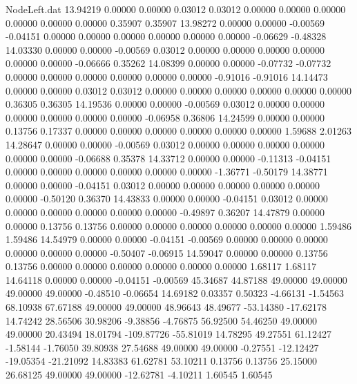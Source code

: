 \begin{filecontents}{NodeLeft.dat}
  13.94219    0.00000    0.00000     0.03012    0.03012    0.00000    0.00000    0.00000    0.00000    0.00000    0.00000    0.35907    0.35907
  13.98272    0.00000    0.00000    -0.00569   -0.04151    0.00000    0.00000    0.00000    0.00000    0.00000    0.00000   -0.06629   -0.48328
  14.03330    0.00000    0.00000    -0.00569    0.03012    0.00000    0.00000    0.00000    0.00000    0.00000    0.00000   -0.06666    0.35262
  14.08399    0.00000    0.00000    -0.07732   -0.07732    0.00000    0.00000    0.00000    0.00000    0.00000    0.00000   -0.91016   -0.91016
  14.14473    0.00000    0.00000     0.03012    0.03012    0.00000    0.00000    0.00000    0.00000    0.00000    0.00000    0.36305    0.36305
  14.19536    0.00000    0.00000    -0.00569    0.03012    0.00000    0.00000    0.00000    0.00000    0.00000    0.00000   -0.06958    0.36806
  14.24599    0.00000    0.00000     0.13756    0.17337    0.00000    0.00000    0.00000    0.00000    0.00000    0.00000    1.59688    2.01263
  14.28647    0.00000    0.00000    -0.00569    0.03012    0.00000    0.00000    0.00000    0.00000    0.00000    0.00000   -0.06688    0.35378
  14.33712    0.00000    0.00000    -0.11313   -0.04151    0.00000    0.00000    0.00000    0.00000    0.00000    0.00000   -1.36771   -0.50179
  14.38771    0.00000    0.00000    -0.04151    0.03012    0.00000    0.00000    0.00000    0.00000    0.00000    0.00000   -0.50120    0.36370
  14.43833    0.00000    0.00000    -0.04151    0.03012    0.00000    0.00000    0.00000    0.00000    0.00000    0.00000   -0.49897    0.36207
  14.47879    0.00000    0.00000     0.13756    0.13756    0.00000    0.00000    0.00000    0.00000    0.00000    0.00000    1.59486    1.59486
  14.54979    0.00000    0.00000    -0.04151   -0.00569    0.00000    0.00000    0.00000    0.00000    0.00000    0.00000   -0.50407   -0.06915
  14.59047    0.00000    0.00000     0.13756    0.13756    0.00000    0.00000    0.00000    0.00000    0.00000    0.00000    1.68117    1.68117
  14.64118    0.00000    0.00000    -0.04151   -0.00569   45.34687   44.87188   49.00000   49.00000   49.00000   49.00000   -0.48510   -0.06654
  14.69182    0.03357    0.50323    -4.66131   -1.54563   68.10938   67.67188   49.00000   49.00000   48.96643   48.49677  -53.14380  -17.62178
  14.74242   28.56506   30.98206    -9.38856   -4.76875   56.92500   54.46250   49.00000   49.00000   20.43494   18.01794 -109.87726  -55.81019
  14.78295   49.27551   61.12427    -1.58144   -1.76050   39.80938   27.54688   49.00000   49.00000   -0.27551  -12.12427  -19.05354  -21.21092
  14.83383   61.62781   53.10211     0.13756    0.13756   25.15000   26.68125   49.00000   49.00000  -12.62781   -4.10211    1.60545    1.60545

\end{filecontents}
